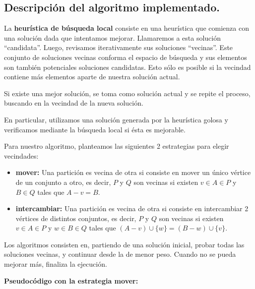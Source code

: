 \subsection{Descripción del algoritmo implementado.}
\vspace*{0.3cm}

La \textbf{heurística de búsqueda local} consiste en una heurística que comienza con una solución dada que intentamos mejorar. Llamaremos a esta solución ``candidata''. Luego, revisamos iterativamente sus soluciones ``vecinas''. Este conjunto de soluciones vecinas conforma el espacio de búsqueda y sus elementos son también potenciales soluciones candidatas. Esto sólo es posible si la vecindad contiene más elementos aparte de nuestra solución actual.

Si existe una mejor solución, se toma como solución actual y se repite el proceso, buscando en la vecindad de la nueva solución.

En particular, utilizamos una solución generada por la heurística golosa y verificamos mediante la búsqueda local si ésta es mejorable.

\vspace*{0.3cm}

Para nuestro algoritmo, planteamos las siguientes 2 estrategias para elegir vecindades:

\begin{itemize}
    \item \textbf{mover:} Una partición es vecina de otra si consiste en mover un único vértice de un conjunto a otro, es decir, $P$ y $Q$ son vecinas si existen $v \in A \in P$ y $B \in Q$ tales que $A - v = B$.

    \item \textbf{intercambiar:} Una partición es vecina de otra si consiste en intercambiar 2 vértices de distintos conjuntos, es decir, $P$ y $Q$ son vecinas si existen $v \in A \in P$ y $w \in B \in Q$ tales que $(A - v) \cup \{w\} = (B - w) \cup \{v\}$.
\end{itemize}

Los algoritmos consisten en, partiendo de una solución inicial, probar todas las soluciones vecinas, y continuar desde la de menor peso. Cuando no se pueda mejorar más, finaliza la ejecución.

\vspace*{0.5cm}

\textbf{Pseudocódigo con la estrategia mover:}

\vspace*{0.3cm}

